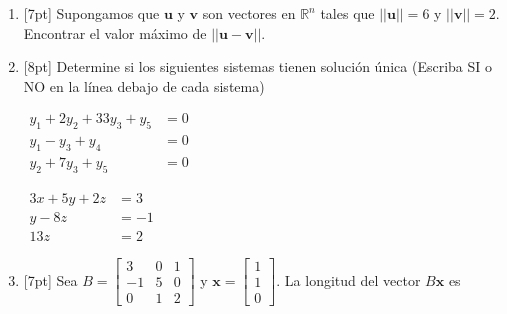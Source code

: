 \documentclass[11pt]{article}
\begin{document}
\begin{enumerate}
\item{}[7pt] Supongamos que $\mathbf{u}$ y $\mathbf{v}$ son vectores en $\mathbb{R}^n$ tales que $||\mathbf{u}||=6$ y $||\mathbf{v}||=2$. Encontrar el valor máximo de $||\mathbf{u}-\mathbf{v}||$.

\vspace{4pt}

\item{}[8pt] Determine si los siguientes sistemas tienen solución única (Escriba SI o NO en la línea debajo de cada sistema)

\vspace{6pt}
\noindent
\begin{minipage}[t]{0.5\linewidth}
$\begin{aligned}
y_1+2y_2+33y_3+y_5 &=0\\
y_1-y_3+y_4 &=0\\
y_2+7y_3+y_5 &=0
\end{aligned}$

\vspace{4pt}
\dotfill
\end{minipage}%
\begin{minipage}[t]{0.46\linewidth}
$\begin{aligned}
3x+5y+2z &=3\\
y-8z &=-1\\
13z &=2
\end{aligned}$

\vspace{4pt}
\dotfill
\end{minipage}

\item{}[7pt] Sea $B = \begin{bmatrix}3&0&1\\-1&5&0\\0&1&2\end{bmatrix}$ y $\mathbf{x} = \begin{bmatrix}1\\1\\0\end{bmatrix}$. La longitud del vector $B\mathbf{x}$ es

\vspace{4pt}


\end{enumerate}
\end{document}
